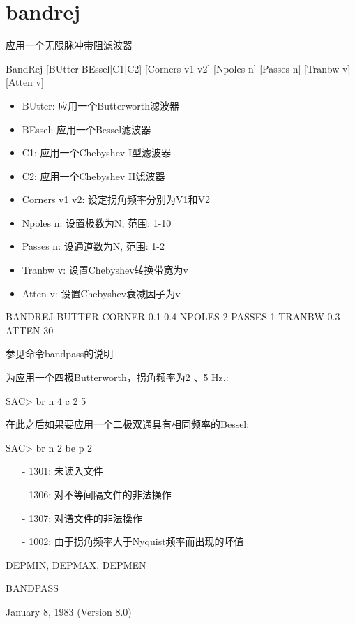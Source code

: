 \section{bandrej}
\label{cmd:bandrej}

应用一个无限脉冲带阻滤波器

BandRej [BUtter|BEssel|C1|C2] [Corners v1 v2] [Npoles n] [Passes n] [Tranbw v] [Atten v]

\begin{itemize}
\item BUtter: 应用一个Butterworth滤波器
\item BEssel:  应用一个Bessel滤波器
\item C1: 应用一个Chebyshev I型滤波器
\item C2: 应用一个Chebyshev II滤波器
\item Corners v1 v2: 设定拐角频率分别为V1和V2
\item Npoles n: 设置极数为N, 范围: 1-10
\item Passes n: 设通道数为N, 范围: 1-2
\item Tranbw v: 设置Chebyshev转换带宽为v
\item Atten v: 设置Chebyshev衰减因子为v
\end{itemize}

BANDREJ BUTTER CORNER 0.1 0.4 NPOLES 2 PASSES 1 TRANBW 0.3 ATTEN 30

参见命令bandpass的说明

为应用一个四极Butterworth，拐角频率为2 、5 Hz.:
\begin{SACCode}
SAC> br n 4 c 2 5
\end{SACCode}
在此之后如果要应用一个二极双通具有相同频率的Bessel:
\begin{SACCode}
SAC> br n 2 be p 2
\end{SACCode}

\begin{itemize}
\item[-]1301: 未读入文件
\item[-]1306: 对不等间隔文件的非法操作
\item[-]1307: 对谱文件的非法操作
\item[-] 1002: 由于拐角频率大于Nyquist频率而出现的坏值
\end{itemize}

DEPMIN, DEPMAX, DEPMEN

BANDPASS

January 8, 1983 (Version 8.0)
